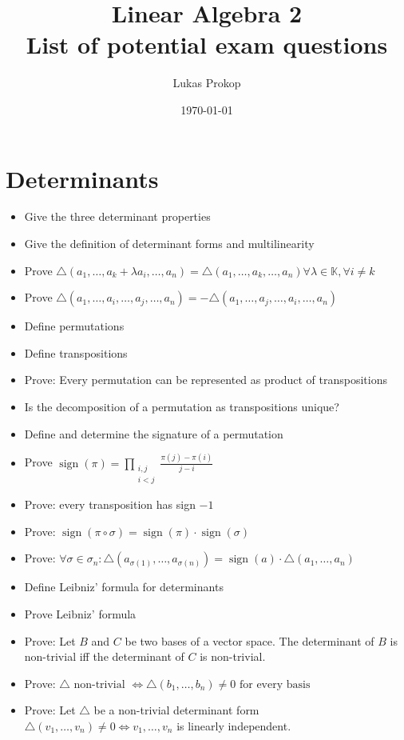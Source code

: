 \documentclass[a4paper]{article}
\title{
  Linear Algebra 2 \\
  List of potential exam questions
}
\date{\today}
\author{Lukas Prokop}
\DeclareMathOperator{\sign}{sign}
\begin{document}
\maketitle

\section{Determinants}

\begin{itemize}
  \item Give the three determinant properties
  \item Give the definition of determinant forms and multilinearity
  \item Prove $\triangle(a_1, \dots, a_k + \lambda a_i, \dots, a_n) = \triangle(a_1, \dots, a_k, \dots, a_n) \forall \lambda \in \mathbb K, \forall i \neq k$
  \item Prove $\triangle(a_1, \dots, a_i, \dots, a_j, \dots, a_n) = -\triangle(a_1, \dots, a_j, \dots, a_i, \dots, a_n)$
  \item Define permutations
  \item Define transpositions
  \item Prove: Every permutation can be represented as product of transpositions
  \item Is the decomposition of a permutation as transpositions unique?
  \item Define and determine the signature of a permutation
  \item Prove $\sign(\pi) = \prod_{\substack{i,j \\ i < j}} \frac{\pi(j) - \pi(i)}{j-i}$
  \item Prove: every transposition has sign $-1$
  \item Prove: $\sign(\pi \circ \sigma) = \sign(\pi) \cdot \sign(\sigma)$
  \item Prove: $\forall \sigma \in \sigma_n: \triangle(a_{\sigma(1)}, \dots, a_{\sigma(n)}) = \sign(a) \cdot \triangle(a_1, \dots, a_n)$
  \item Define Leibniz' formula for determinants
  \item Prove Leibniz' formula
  \item Prove: Let $B$ and $C$ be two bases of a vector space. The determinant of $B$ is non-trivial iff the determinant of $C$ is non-trivial.
  \item Prove: $\triangle \text{ non-trivial } \iff \triangle(b_1, \dots, b_n) \neq 0 \text{ for every basis}$
  \item Prove: Let $\triangle$ be a non-trivial determinant form $\triangle(v_1, \dots, v_n) \neq 0 \iff v_1, \dots, v_n$ is linearly independent.

\end{itemize}
\end{document}

